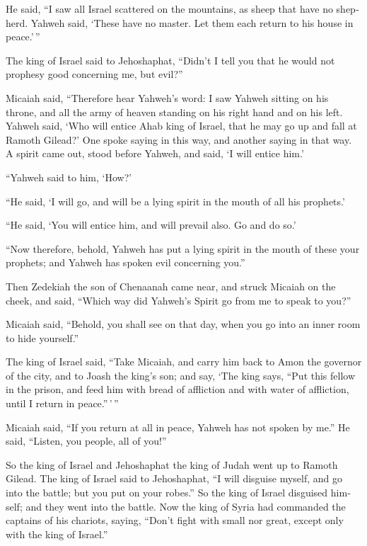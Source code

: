 \begin{paracol}{2}
\begin{otherlanguage}{english}
 He said, ``I saw all Israel scattered on the mountains,
as sheep that have no shepherd. Yahweh said, `These have no master. Let
them each return to his house in peace.'\,''

 The king of Israel said to Jehoshaphat, ``Didn't I tell
you that he would not prophesy good concerning me, but evil?''

 Micaiah said, ``Therefore hear Yahweh's word: I saw
Yahweh sitting on his throne, and all the army of heaven standing on his
right hand and on his left.  Yahweh said, `Who will
entice Ahab king of Israel, that he may go up and fall at Ramoth
Gilead?' One spoke saying in this way, and another saying in that way.
 A spirit came out, stood before Yahweh, and said, `I
will entice him.'

``Yahweh said to him, `How?'

 ``He said, `I will go, and will be a lying spirit in the
mouth of all his prophets.'

``He said, `You will entice him, and will prevail also. Go and do so.'

 ``Now therefore, behold, Yahweh has put a lying spirit
in the mouth of these your prophets; and Yahweh has spoken evil
concerning you.''

 Then Zedekiah the son of Chenaanah came near, and struck
Micaiah on the cheek, and said, ``Which way did Yahweh's Spirit go from
me to speak to you?''

 Micaiah said, ``Behold, you shall see on that day, when
you go into an inner room to hide yourself.''

 The king of Israel said, ``Take Micaiah, and carry him
back to Amon the governor of the city, and to Joash the king's son;
 and say, `The king says, ``Put this fellow in the
prison, and feed him with bread of affliction and with water of
affliction, until I return in peace.''\,'\,''

 Micaiah said, ``If you return at all in peace, Yahweh
has not spoken by me.'' He said, ``Listen, you people, all of you!''

 So the king of Israel and Jehoshaphat the king of Judah
went up to Ramoth Gilead.  The king of Israel said to
Jehoshaphat, ``I will disguise myself, and go into the battle; but you
put on your robes.'' So the king of Israel disguised himself; and they
went into the battle.  Now the king of Syria had
commanded the captains of his chariots, saying, ``Don't fight with small
nor great, except only with the king of Israel.''


\end{otherlanguage}
\end{paracol}
